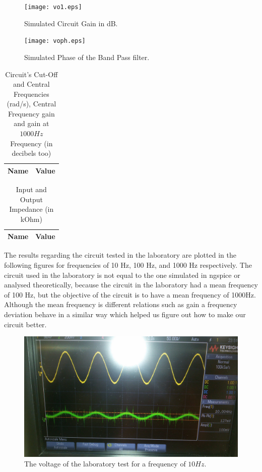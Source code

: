 \begin{figure}[H] 
\centering
\texttt{[image: vo1.eps]}
\caption{Simulated Circuit Gain in dB.}
\label{Fig4: GaindB}
\end{figure}

\begin{figure}[H] 
\centering
\texttt{[image: voph.eps]}
\caption{Simulated Phase of the Band Pass filter.}
\label{Fig5: Phase}
\end{figure}


\begin{table}[H]
\centering
\begin{tabular}{|l|l|}
\hline
{\bf Name} & {\bf Value} \\ \hline
    
\end{tabular}
\caption{Circuit's Cut-Off and Central Frequencies (rad/s), Central Frequency gain and gain at $1000Hz$ Frequency (in decibels too)}
\end{table}

\begin{table}[H]
\centering
\begin{tabular}{|l|l|}
\hline
{\bf Name} & {\bf Value} \\ \hline
    
    
\end{tabular}
\caption{Input and Output Impedance (in kOhm)}
\end{table}

The results regarding the circuit tested in the laboratory are plotted in the following figures for frequencies of 10 Hz, 100 Hz, and 1000 Hz respectively.
The circuit used in the laboratory is not equal to the one simulated in ngspice or analysed theoretically, because the circuit in the laboratory had a mean frequency of 100 Hz, but the objective of the circuit is to have a mean frequency of 1000Hz. Although the mean frequency is different relations such as gain a frequency deviation behave in a similar way which helped us figure out how to make our circuit better.

\begin{figure}[H] 
\centering
\includegraphics[width=0.6\linewidth]{10Hz.jpeg}
\caption{The voltage of the laboratory test for a frequency of $10Hz$.}
\label{Fig9: 10Hz}
\end{figure}

